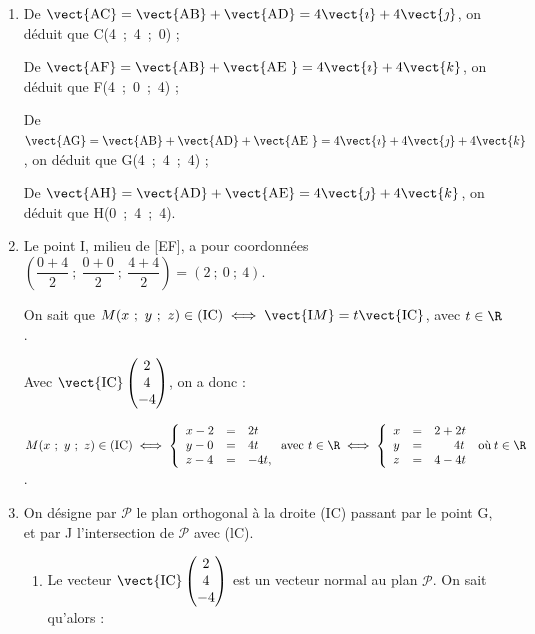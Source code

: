 \begin{enumerate}
\item %
De $\vect{\text{AC}} = \vect{\text{AB}} + \vect{\text{AD}} = 4\vect{\imath} + 4\vect{\jmath}$, on déduit que C(4~;~4~;~0) ;

De $\vect{\text{AF}} = \vect{\text{AB}} + \vect{\text{AE }} = 4\vect{\imath} + 4\vect{k}$, on déduit que F(4~;~0~;~4) ;

De $\vect{\text{AG}} = \vect{\text{AB}} +  \vect{\text{AD}} + \vect{\text{AE }} = 4\vect{\imath}+ 4\vect{\jmath} + 4\vect{k}$, on déduit que G(4~;~4~;~4) ;

De $\vect{\text{AH}} = \vect{\text{AD}} +  \vect{\text{AE}} = 4\vect{\jmath}+ 4\vect{k}$, on déduit que H(0~;~4~;~4).

\item %

Le point I, milieu de [EF], a pour coordonnées $\left(\dfrac{0 + 4}{2}~;~\dfrac{0 + 0}{2}~;~\dfrac{4 + 4}{2} \right) = (2~;~0~;~4)$.

On sait que $M(x~;~y~;~z) \in (\text{IC}) \iff \vect{\text{I}M} = t \vect{\text{IC}}$, avec $t \in \R$.

Avec $\vect{\text{IC}}\begin{pmatrix}2\\4\\-4\end{pmatrix}$, on a donc :

$M(x~;~y~;~z) \in (\text{IC}) \iff \left\{\begin{array}{l c l}
x - 2&=&2t\\
y - 0&=&4t\\
z - 4&=&-4t,
\end{array}\right.
 \text{avec } t \in \R \iff
\left\{\begin{array}{l c l}
x &=&2+2t\\
y &=&\phantom{2 +~}4t\\
z &=&4 - 4t
\end{array}\right.\:\text{où} \: t \in \R$.

\item On désigne par $\mathcal{P}$ le plan orthogonal à la droite (IC) passant par le point G, et par J l'intersection de $\mathcal{P}$ avec (lC).

	\begin{enumerate}
		\item %
Le vecteur $\vect{\text{IC}}\begin{pmatrix}2\\4\\-4\end{pmatrix}$ est un vecteur normal au plan $\mathcal{P}$. On sait qu'alors :
		

\end{enumerate}
\end{enumerate}

